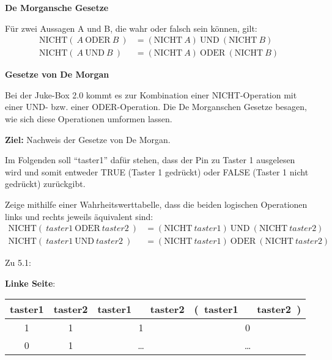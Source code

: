 \documentclass[ngerman, 11pt]{scrreprt}
\begin{document}
	\bigskip
	\begin{zsfg}
		\textbf{De Morgansche Gesetze}
		
		Für zwei Aussagen A und B, die wahr oder falsch sein können, gilt:
		\begin{align*}
		\text{NICHT}(~A ~\text{ODER}~ B~) &= (\text{NICHT}~ A) ~\text{UND}~ (\text{NICHT}~ B) \\
		\text{NICHT}(~A ~\text{UND}~ B~) &= (\text{NICHT}~ A) ~\text{ODER}~ (\text{NICHT}~ B) 
		\end{align*}
	\end{zsfg}
	
	\newpage
	\setcounter{chapter}{5}
	\setcounter{section}{1}

	\textbf{Gesetze von De Morgan}
	
	Bei der Juke-Box 2.0 kommt es zur Kombination einer NICHT-Operation mit einer UND- bzw. einer ODER-Operation. Die De Morganschen Gesetze besagen, wie sich diese Operationen umformen lassen.
	
	\begin{ziel}
		\textbf{Ziel:} Nachweis der Gesetze von De Morgan.
	\end{ziel}
	
	Im Folgenden soll \enquote{taster1} dafür stehen, dass der Pin zu Taster 1 ausgelesen wird und somit entweder TRUE (Taster 1 gedrückt) oder FALSE (Taster 1 nicht gedrückt) zurückgibt.
	
	Zeige mithilfe einer Wahrheitswerttabelle, dass die beiden logischen Operationen links und rechts jeweils äquivalent sind:
	\begin{align}
	\text{NICHT}(~taster1 ~\text{ODER}~ taster2~) &= (\text{NICHT}~ taster1) ~\text{UND}~ (\text{NICHT}~ taster2) \\
	\text{NICHT}(~taster1 ~\text{UND}~ taster2~) &= (\text{NICHT}~ taster1) ~\text{ODER}~ (\text{NICHT}~ taster2) 
	\end{align}
	
	Zu 5.1:
	
	\textbf{Linke Seite}:
	
	\medskip
	\begin{minipage}{\textwidth}
		\small
		\centering
		\begin{tabular}{c|c|c|c}
			taster1 & taster2 & taster1 ~\text{ODER}~ taster2 & \text{NICHT}(~taster1 ~\text{ODER}~ taster2~)\\ \hline
			1 & 1 & 1 & 0  \\
			0 & 1 & \dots & \dots  \\
		\end{tabular}
	\end{minipage}
	
\end{document}
